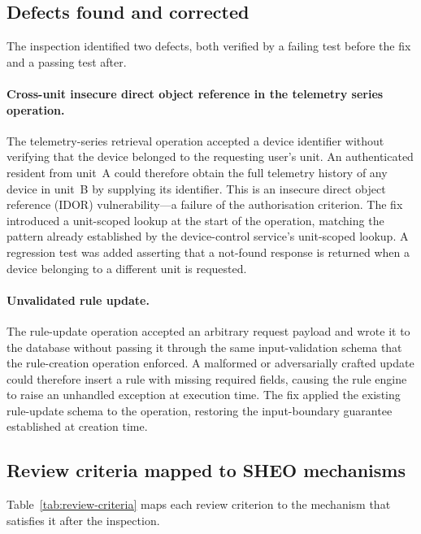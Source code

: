 \subsection{Defects found and corrected}

The inspection identified two defects, both verified by a failing test before the fix
and a passing test after.

\paragraph{Cross-unit insecure direct object reference in the telemetry series
operation.}
The telemetry-series retrieval operation accepted a device identifier without verifying
that the device belonged to the requesting user's unit. An authenticated resident from
unit~A could therefore obtain the full telemetry history of any device in unit~B by
supplying its identifier. This is an insecure direct object reference (IDOR)
vulnerability---a failure of the authorisation criterion. The fix introduced a
unit-scoped lookup at the start of the operation, matching the pattern already
established by the device-control service's unit-scoped lookup. A regression test was
added asserting that a not-found response is returned when a device belonging to a
different unit is requested.

\paragraph{Unvalidated rule update.}
The rule-update operation accepted an arbitrary request payload and wrote it to the
database without passing it through the same input-validation schema that the
rule-creation operation enforced. A malformed or adversarially crafted update could
therefore insert a rule with missing required fields, causing the rule engine to raise
an unhandled exception at execution time. The fix applied the existing rule-update
schema to the operation, restoring the input-boundary guarantee established at creation
time.

\subsection{Review criteria mapped to SHEO mechanisms}

Table~\ref{tab:review-criteria} maps each review criterion to the mechanism
that satisfies it after the inspection.

